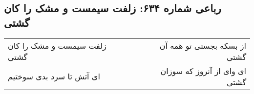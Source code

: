 \begin{center}
\section*{رباعی شماره ۶۳۴: زلفت سیمست و مشک را کان گشتی}
\label{sec:sh634}
\begin{longtable}{l p{0.5cm} r}
زلفت سیمست و مشک را کان گشتی
&&
از بسکه بجستی تو همه آن گشتی
\\
ای آتش تا سرد بدی سوختیم
&&
ای وای از آنروز که سوزان گشتی
\\
\end{longtable}
\end{center}
